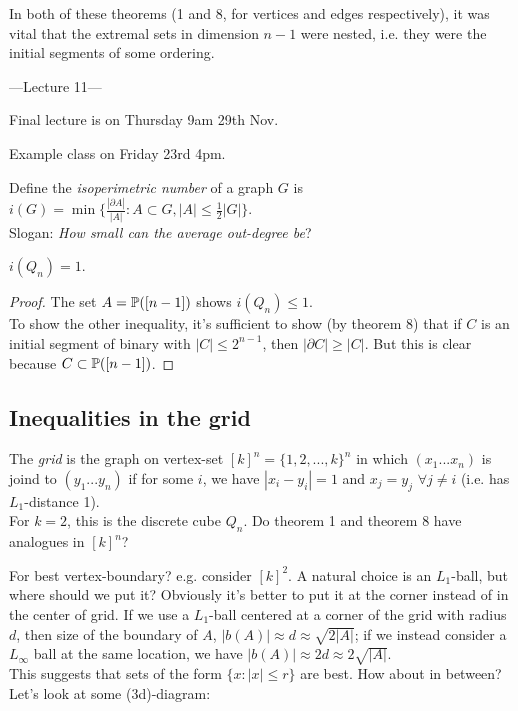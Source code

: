 \documentclass[a4paper]{article}
\begin{document}
\begin{rem}
    In both of these theorems (1 and 8, for vertices and edges respectively), it was vital that the extremal sets in dimension $n-1$ were nested, i.e. they were the initial segments of some ordering.
\end{rem}

---Lecture 11---

Final lecture is on Thursday 9am 29th Nov.

Example class on Friday 23rd 4pm.

Define the \emph{isoperimetric number} of a graph $G$ is $i(G) = \min\{\frac{|\partial A|}{|A|}: A \subset G, |A| \leq \frac{1}{2}|G|\}$.\\
Slogan: \emph{How small can the average out-degree be}?

\begin{coro}
    $i(Q_n) = 1$.
    \begin{proof}
        The set $A = \P([n-1])$ shows $i(Q_n) \leq 1$.\\
        To show the other inequality, it's sufficient to show (by theorem 8) that if $C$ is an initial segment of binary with $|C| \leq 2^{n-1}$, then $|\partial C| \geq |C|$.
            But this is clear because $C \subset \P([n-1])$.
    \end{proof}
\end{coro}

\subsection{Inequalities in the grid}

The \emph{grid} is the graph on vertex-set $[k]^n = \{1,2,...,k\}^n$ in which $(x_1...x_n)$ is joind to $(y_1...y_n)$ if for some $i$, we have $|x_i - y_i| = 1$ and $x_j = y_j$ $\forall j \neq i$ (i.e. has $L_1$-distance 1).\\
For $k=2$, this is the discrete cube $Q_n$. Do theorem 1 and theorem 8 have analogues in $[k]^n$?

For best vertex-boundary? e.g. consider $[k]^2$. A natural choice is an $L_1$-ball, but where should we put it? Obviously it's better to put it at the corner instead of in the center of grid. If we use a $L_1$-ball centered at a corner of the grid with radius $d$, then size of the boundary of $A$, $|b(A)| \approx d \approx \sqrt{2|A|}$; if we instead consider a $L_\infty$ ball at the same location, we have $|b(A)| \approx 2d \approx 2\sqrt{|A|}$.\\
This suggests that sets of the form $\{x: |x| \leq r\}$ are best. How about in between? Let's look at some (3d)-diagram:
\end{document}
